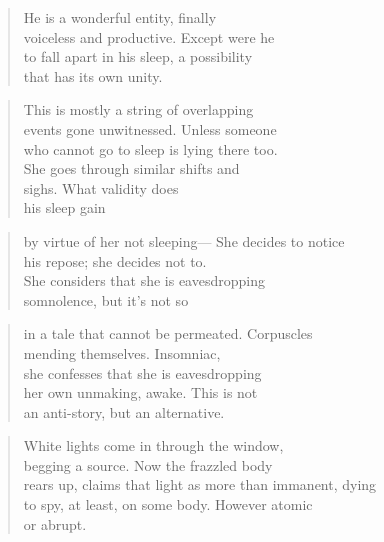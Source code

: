 \documentclass[
]{memoir}
\newlength{\drop}%
\begin{document}
\begin{verse}
He is a wonderful entity, finally\\
voiceless and productive. Except were he\\
to fall apart in his sleep, a possibility\\
that has its own unity.\\
\end{verse}

\begin{verse}
This is mostly a string of overlapping\\
events gone unwitnessed. Unless someone\\
who cannot go to sleep is lying there too.\\
She goes through similar shifts and\\
sighs. What validity does\\
his sleep gain\\
\end{verse}

\begin{verse}
by virtue of her not sleeping— She decides to notice\\
his repose; she decides not to.\\
She considers that she is eavesdropping\\
somnolence, but it's not so\\
\end{verse}

\begin{verse}
in a tale that cannot be permeated. Corpuscles\\
mending themselves. Insomniac,\\
she confesses that she is eavesdropping\\
her own unmaking, awake. This is not\\
an anti-story, but an alternative.\\
\end{verse}

\begin{verse}
White lights come in through the window,\\
begging a source. Now the frazzled body\\
rears up, claims that light as more than immanent, dying\\
to spy, at least, on some body. However atomic\\
or abrupt.\\
\end{verse}
\end{document}
